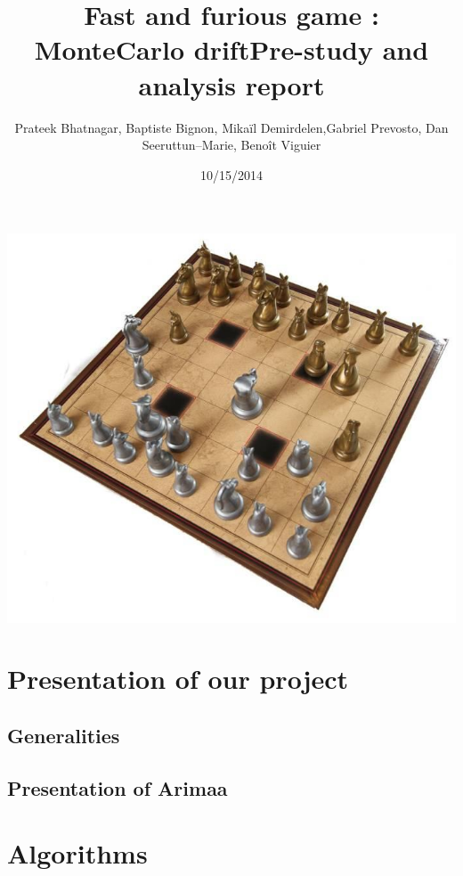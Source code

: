 \documentclass[12pt]{article}
\title{Fast and furious game : MonteCarlo drift\smallbreak Pre-study and analysis report}
\author{Prateek Bhatnagar, Baptiste Bignon, Mikaïl Demirdelen,\endline Gabriel Prevosto, Dan Seeruttun--Marie,  Benoît Viguier}
\date{10/15/2014}
\begin{document}
\maketitle
\includegraphics[scale=0.5]{img/arimaa}
\newpage
\begin{abstract}

\end{abstract}


\newpage
\tableofcontents
\newpage

\section{Presentation of our project}
\subsection{Generalities}
\subsection{Presentation of Arimaa} 
\section{Algorithms}
\end{document}
